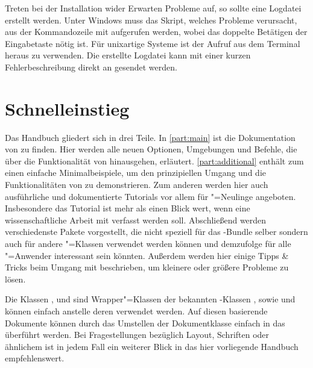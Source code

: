Treten bei der Installation wider Erwarten Probleme auf, so sollte eine 
Logdatei erstellt werden. Unter Windows muss das Skript, welches Probleme 
verursacht, aus der Kommandozeile mit
 aufgerufen werden, wobei das 
doppelte Betätigen der Eingabetaste nötig ist. Für unixartige Systeme 
ist der Aufruf  aus dem 
Terminal heraus zu verwenden. Die erstellte Logdatei kann mit einer kurzen 
Fehlerbeschreibung direkt an \Email{\tudscrmail} gesendet werden.
%


\section{Schnelleinstieg}
Das Handbuch gliedert sich in drei Teile. In \autoref{part:main} ist die 
Dokumentation von \TUDScript zu finden. Hier werden alle neuen Optionen, 
Umgebungen und Befehle, die über die Funktionalität von \KOMAScript{} 
hinausgehen, erläutert. \autoref{part:additional} enthält zum einen einfache 
Minimalbeispiele, um den prinzipiellen Umgang und die Funktionalitäten von 
\TUDScript zu demonstrieren. Zum anderen werden hier auch ausführliche und 
dokumentierte Tutorials vor allem für "=Neulinge angeboten. 
Insbesondere das Tutorial  ist mehr als einen Blick wert, 
wenn eine wissenschaftliche Arbeit mit  verfasst werden soll.
Abschließend werden verschiedenste Pakete vorgestellt, die nicht speziell für 
das \TUDScript-Bundle selber sondern auch für andere "=Klassen
verwendet werden können und demzufolge für alle "=Anwender 
interessant sein könnten. Außerdem werden hier einige Tipps \& Tricks beim 
Umgang mit  beschrieben, um kleinere oder größere Probleme zu 
lösen.

Die Klassen ,  und  
sind Wrapper"=Klassen der bekannten \KOMAScript-Klassen , 
 sowie  und können einfach anstelle deren 
verwendet werden. Auf diesen basierende Dokumente können durch das Umstellen 
der Dokumentklasse einfach in das \TUDCD überführt werden. Bei Fragestellungen 
bezüglich Layout, Schriften oder ähnlichem ist in jedem Fall ein weiterer Blick 
in das hier vorliegende Handbuch empfehlenswert.
